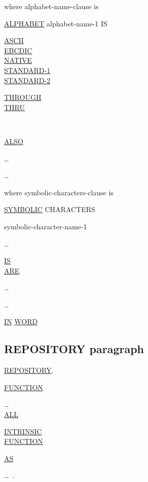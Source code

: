\documentclass[a4paper,oneside,svgnames]{scrbook}
\makeatletter
\newcommand{\key}[1]{\underline{#1}}
\newenvironment{0-1}{$\left[ \begin{tabular}{@{}l@{}}}{\end{tabular} \right]$}
\newenvironment{1=}{$\left\{ \begin{tabular}{@{}l@{}}}{\end{tabular} \right\}$}
\makeatother
\begin{document}
where alphabet-name-clause is

\key{ALPHABET} alphabet-name-1 IS
\begin{1=}
  \key{ASCII} \\
  \key{EBCDIC} \\
  \key{NATIVE} \\
  \key{STANDARD-1} \\
  \key{STANDARD-2} \\
  \begin{1=}
    \literal
    \begin{0-1}
      \begin{1=}
        \key{THROUGH} \\
        \key{THRU}
      \end{1=}
      \literal \\
      \begin{1=}
        \key{ALSO} \literal
      \end{1=}\ldots
    \end{0-1}
  \end{1=}\ldots
\end{1=}

where symbolic-characters-clause is

\key{SYMBOLIC} CHARACTERS
\begin{1=}
  \begin{1=}
    symbolic-character-name-1
  \end{1=}\ldots
  \begin{1=}
    \key{IS} \\
    \key{ARE}
  \end{1=}
  \begin{1=}
    \integer
  \end{1=}\ldots
\end{1=}\ldots
\begin{0-1}
  \key{IN} \key{WORD}
\end{0-1}

\subsection{REPOSITORY paragraph}

\key{REPOSITORY}.

\begin{0-1}
  \begin{1=}
    \key{FUNCTION}
    \begin{1=}
      \begin{1=}
        \functionname
      \end{1=}\ldots \\

      \key{ALL}
    \end{1=}
    \key{INTRINSIC} \\

    \key{FUNCTION} \functionname
    \begin{0-1}
      \key{AS} \literal
    \end{0-1}
  \end{1=}\ldots\ {}.
\end{0-1}
\end{document}
